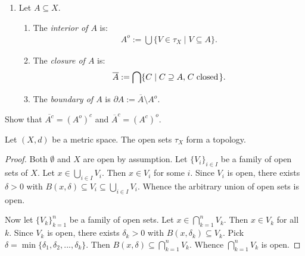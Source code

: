 \begin{definition}
\begin{enumerate}[label = (\arabic*),itemsep=1pt,topsep=3pt]
                \item Let $A \subseteq X$.
                    \begin{enumerate}[label = (\roman*),itemsep=1pt,topsep=3pt]
                        \item The \textit{interior of $A$} is:
                            \begin{equation*}
                            \begin{split}
                                A^o := \bigcup \{V \in \tau_X \mid V \subseteq A\}.
                            \end{split}
                            \end{equation*}
                        \item The \textit{closure of $A$} is:
                            \begin{equation*}
                            \begin{split}
                                \overline{A}:= \bigcap \{C \mid C \supseteq A, \h1C \h3\text{closed}\h1\}.
                            \end{split}
                            \end{equation*}
                        \item The \textit{boundary of $A$} is $\partial A := \overline{A}\setminus A^o$.
                    \end{enumerate}
            \end{enumerate}
    \end{definition}

    \begin{exercise}
        Show that $\overline{A^c} = (A^o)^c$ and $\overline{A}^c = (A^c)^o$.
    \end{exercise}

    \begin{proposition}\label{prop:open-sets-topology}
        Let $(X,d)$ be a metric space. The open sets $\tau_X$ form a topology.
    \end{proposition}
        \begin{proof}
            Both $\emptyset$ and $X$ are open by assumption. Let $\{V_i\}_{i \in I}$ be a family of open sets of $X$. Let $x \in \bigcup_{i \in I} V_i$. Then $x \in V_i$ for some $i$. Since $V_i$ is open, there exists $\delta>0$ with $B(x,\delta) \subseteq V_i \subseteq \bigcup_{i \in I}V_i$. Whence the arbitrary union of open sets is open.
            
            Now let $\{V_k\}_{k = 1}^n$ be a family of open sets. Let $x \in \bigcap_{k = 1}^n V_k$. Then $x \in V_k$ for all $k$. Since $V_k$ is open, there exists $\delta_k > 0$ with $B(x,\delta_k) \subseteq V_k$. Pick $\delta = \min\{\delta_1,\delta_2,...,\delta_k\}$. Then $B(x,\delta) \subseteq \bigcap_{k = 1}^n V_k$. Whence $\bigcap_{k = 1}^n V_k$ is open.
        \end{proof}
    
